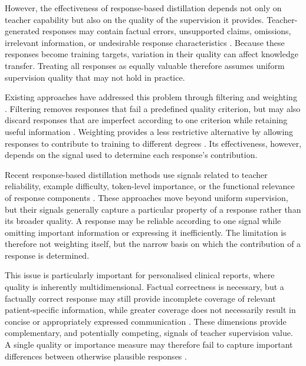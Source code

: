 \documentclass[ %
                    author={Aman Kumar Singh},
                supervisor={Dr. Edwin Simpson},
                    degree={MSc},
                     title={Quality-Aware Knowledge Distillation of Large Language Models for Efficient Personalised Clinical Report Generation},
                  subtitle={},
                      type={},
                      year={2021}]{dissertation}
\begin{document}
However, the effectiveness of response-based distillation depends not only on
teacher capability but also on the quality of the supervision it provides.
Teacher-generated responses may contain factual errors, unsupported claims,
omissions, irrelevant information, or undesirable response characteristics
\cite{zhang_lifting_2023,montenegro_what_2025,davidson_reasoning-driven_2026}.
Because these responses become training targets, variation in their quality
can affect knowledge transfer. Treating all responses as equally valuable
therefore assumes uniform supervision quality that may not hold in practice.

Existing approaches have addressed this problem through filtering and
weighting \cite{liu_air_2025-1,lei_learning_2025,lee_what_2026}. Filtering
removes responses that fail a predefined quality criterion, but may also
discard responses that are imperfect according to one criterion while
retaining useful information \cite{shen_logitwise_2025}. Weighting provides a less restrictive
alternative by allowing responses to contribute to training to different
degrees \cite{zhao_rethinking_2026}. Its effectiveness, however, depends on
the signal used to determine each response's contribution.

Recent response-based distillation methods use signals related to teacher
reliability, example difficulty, token-level importance, or the functional
relevance of response components
\cite{chen_knowledge_2024,jiang_difficulty-aware_2027,tang_smartad_2026}.
These approaches move beyond uniform supervision, but their signals generally
capture a particular property of a response rather than its broader quality.
A response may be reliable according to one signal while omitting important
information or expressing it inefficiently. The limitation is therefore not
weighting itself, but the narrow basis on which the contribution of a response
is determined.

This issue is particularly important for personalised clinical reports,
where quality is inherently multidimensional. Factual correctness is
necessary, but a factually correct response may still provide incomplete
coverage of relevant patient-specific information, while greater coverage
does not necessarily result in concise or appropriately expressed
communication \cite{ahmad_finetuning_2026}. These dimensions provide complementary, and potentially competing, signals of teacher supervision value. A single quality or importance measure may therefore fail to capture important differences between otherwise plausible responses \cite{liu_g-eval_2023, fabbri_summeval_2021}.
\end{document}

